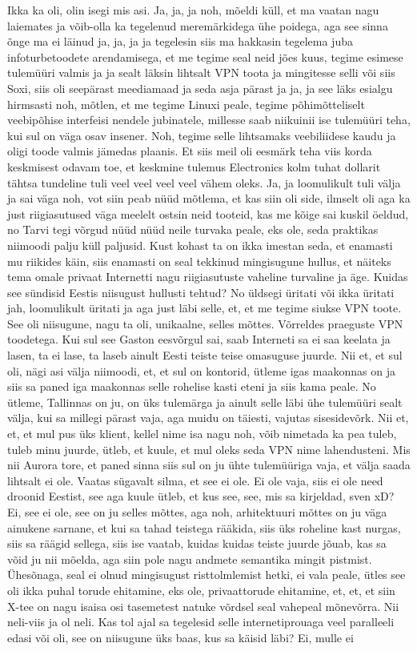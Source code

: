 Ikka ka oli, olin isegi mis asi. Ja, ja, ja noh, mõeldi küll, et ma vaatan nagu laiemates ja võib-olla ka tegelenud meremärkidega ühe poidega, aga see sinna õnge ma ei läinud ja, ja, ja ja tegelesin siis ma hakkasin tegelema juba infoturbetoodete arendamisega, et me tegime seal neid jões kuus, tegime esimese tulemüüri valmis ja ja sealt läksin lihtsalt VPN toota ja mingitesse selli või siis Soxi, siis oli seepärast meediamaad ja seda asja pärast ja ja, ja see läks esialgu hirmsasti noh, mõtlen, et me tegime Linuxi peale, tegime põhimõtteliselt veebipõhise interfeisi nendele jubinatele, millesse saab niikuinii ise tulemüüri teha, kui sul on väga osav insener. Noh, tegime selle lihtsamaks veebiliidese kaudu ja oligi toode valmis jämedas plaanis. Et siis meil oli eesmärk teha viis korda keskmisest odavam toe, et keskmine tulemus Electronics kolm tuhat dollarit tähtsa tundeline tuli veel veel veel veel vähem oleks. Ja, ja loomulikult tuli välja ja sai väga noh, vot siin peab nüüd mõtlema, et kas siin oli side, ilmselt oli aga ka just riigiasutused väga meelelt ostsin neid tooteid, kas me kõige sai kuskil öeldud, no Tarvi tegi võrgud nüüd nüüd neile turvaka peale, eks ole, seda praktikas niimoodi palju küll paljusid. Kust kohast ta on ikka imestan seda, et enamasti mu riikides käin, siis enamasti on seal tekkinud mingisugune hullus, et näiteks tema omale privaat Internetti nagu riigiasutuste vaheline turvaline ja äge. Kuidas see sündisid Eestis niisugust hullusti tehtud? No üldsegi üritati või ikka üritati jah, loomulikult üritati ja aga just läbi selle, et, et me tegime siukse VPN toote. See oli niisugune, nagu ta oli, unikaalne, selles mõttes. Võrreldes praeguste VPN toodetega. Kui sul see Gaston eesvõrgul sai, saab Interneti sa ei saa keelata ja lasen, ta ei lase, ta laseb ainult Eesti teiste teise omasuguse juurde. Nii et, et sul oli, nägi asi välja niimoodi, et, et sul on kontorid, ütleme igas maakonnas on ja siis sa paned iga maakonnas selle rohelise kasti eteni ja siis kama peale. No ütleme, Tallinnas on ju, on üks tulemärga ja ainult selle läbi ühe tulemüüri sealt välja, kui sa millegi pärast vaja, aga muidu on täiesti, vajutas sisesidevõrk. Nii et, et, et mul pus üks klient, kellel nime isa nagu noh, võib nimetada ka pea tuleb, tuleb minu juurde, ütleb, et kuule, et mul oleks seda VPN nime lahendusteni. Mis nii Aurora tore, et paned sinna siis sul on ju ühte tulemüüriga vaja, et välja saada lihtsalt ei ole. Vaatas sügavalt silma, et see ei ole. Ei ole vaja, siis ei ole need droonid Eestist, see aga kuule ütleb, et kus see, see, mis sa kirjeldad, sven xD? Ei, see ei ole, see on ju selles mõttes, aga noh, arhitektuuri mõttes on ju väga ainukene sarnane, et kui sa tahad teistega rääkida, siis üks roheline kast nurgas, siis sa räägid sellega, siis ise vaatab, kuidas kuidas teiste juurde jõuab, kas sa võid ju nii mõelda, aga siin pole nagu andmete semantika mingit pistmist. Ühesõnaga, seal ei olnud mingisugust risttolmlemist hetki, ei vala peale, ütles see oli ikka puhal torude ehitamine, eks ole, privaattorude ehitamine, et, et, et siin X-tee on nagu isaisa osi tasemetest natuke võrdsel seal vahepeal mõnevõrra. Nii neli-viis ja ol neli. Kas tol ajal sa tegelesid selle internetiprouaga veel paralleeli edasi või oli, see on niisugune üks baas, kus sa käisid läbi? Ei, mulle ei 